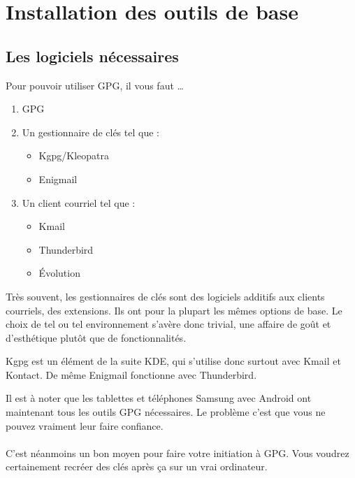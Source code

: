 \chapter{Installation des outils de base}

\section{Les logiciels nécessaires}\label{les-logiciels-nuxe9cessaires}

Pour pouvoir utiliser GPG, il vous faut \ldots{}

\begin{enumerate}
\def\labelenumi{\arabic{enumi}.}
\item GPG
\item Un gestionnaire de clés tel que :

  \begin{itemize}
  \item Kgpg/Kleopatra
  \item Enigmail
  \end{itemize}
  
\item Un client courriel tel que :

  \begin{itemize}
  \item Kmail
  \item Thunderbird
  \item Évolution
  \end{itemize}
\end{enumerate}

Très souvent, les gestionnaires de clés sont des logiciels additifs aux
clients courriels, des extensions. Ils ont pour la plupart les mêmes
options de base. Le choix de tel ou tel environnement s'avère donc
trivial, une affaire de goût et d'esthétique plutôt que de
fonctionnalités.

Kgpg est un élément de la suite KDE, qui s'utilise donc surtout avec
Kmail et Kontact. De même Enigmail fonctionne avec Thunderbird.

\begin{notice}
	Il est à noter que les tablettes et téléphones Samsung avec
Android ont maintenant tous les outils GPG nécessaires. Le problème
c'est que vous ne pouvez vraiment leur faire confiance.\\
\\
C'est néanmoins un bon moyen pour faire votre initiation à GPG.
Vous voudrez certainement recréer des clés après ça sur un vrai
ordinateur.
\end{notice}

